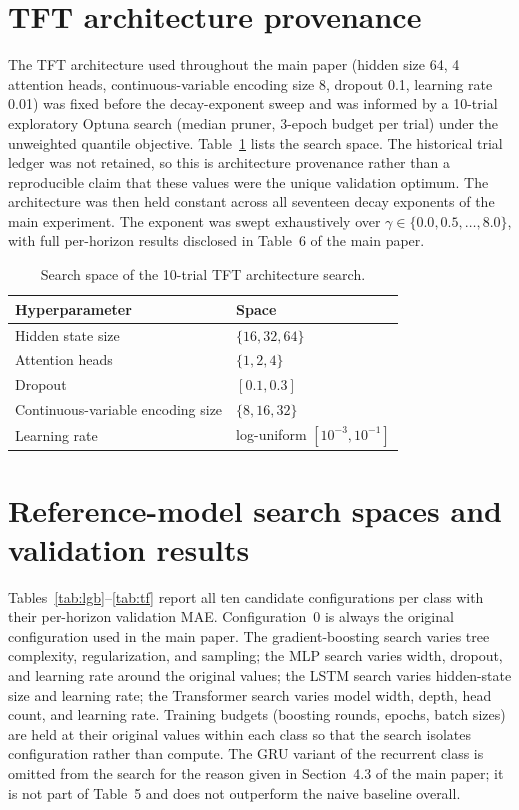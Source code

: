 \documentclass[11pt]{article}
\begin{document}
\section{TFT architecture provenance}
The TFT architecture used throughout the main paper (hidden size 64, 4 attention heads, continuous-variable encoding size 8, dropout 0.1, learning rate 0.01) was fixed before the decay-exponent sweep and was informed by a 10-trial exploratory Optuna search (median pruner, 3-epoch budget per trial) under the unweighted quantile objective. Table~\ref{tab:tftspace} lists the search space. The historical trial ledger was not retained, so this is architecture provenance rather than a reproducible claim that these values were the unique validation optimum. The architecture was then held constant across all seventeen decay exponents of the main experiment. The exponent was swept exhaustively over $\gamma \in \{0.0, 0.5, \dots, 8.0\}$, with full per-horizon results disclosed in Table~6 of the main paper.

\begin{table}[htbp]\centering
\caption{Search space of the 10-trial TFT architecture search.}
\label{tab:tftspace}
\small
\begin{tabular}{ll}
\toprule
Hyperparameter & Space \\
\midrule
Hidden state size & $\{16, 32, 64\}$ \\
Attention heads & $\{1, 2, 4\}$ \\
Dropout & $[0.1, 0.3]$ \\
Continuous-variable encoding size & $\{8, 16, 32\}$ \\
Learning rate & log-uniform $[10^{-3}, 10^{-1}]$ \\
\bottomrule
\end{tabular}
\end{table}

\section{Reference-model search spaces and validation results}
Tables~\ref{tab:lgb}--\ref{tab:tf} report all ten candidate configurations per class with their per-horizon validation MAE. Configuration~0 is always the original configuration used in the main paper. The gradient-boosting search varies tree complexity, regularization, and sampling; the MLP search varies width, dropout, and learning rate around the original values; the LSTM search varies hidden-state size and learning rate; the Transformer search varies model width, depth, head count, and learning rate. Training budgets (boosting rounds, epochs, batch sizes) are held at their original values within each class so that the search isolates configuration rather than compute. The GRU variant of the recurrent class is omitted from the search for the reason given in Section~4.3 of the main paper; it is not part of Table~5 and does not outperform the naive baseline overall.
\end{document}
